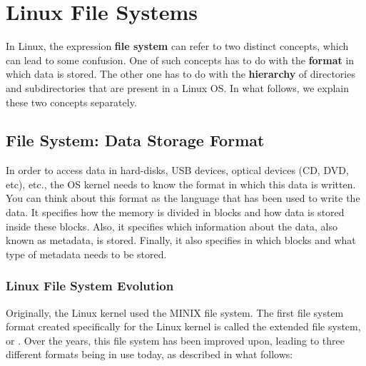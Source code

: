 \chapter{Linux File Systems}\label{ch:file_system}

In Linux, the expression \textbf{file system} can refer to two distinct concepts, which can lead to some confusion. One of such concepts has to do with the \textbf{format} in which data is stored. The other one has to do with the \textbf{hierarchy} of directories and subdirectories that are present in a Linux \acs{OS}. In what follows, we explain these two concepts separately.

\section{File System: Data Storage Format}
\label{sec:data_storage_format}

In order to access data in hard-disks, USB devices, optical devices (CD, DVD, etc), etc., the \acs{OS} kernel needs to know the format in which this data is written. You can think about this format as the language that has been used to write the data. It specifies how the memory is divided in blocks and how data is stored inside these blocks. Also, it specifies which information about the data, also known as metadata, is stored. Finally, it also specifies in which blocks and what type of metadata needs to be stored.

\subsection{Linux File System Evolution}

Originally, the Linux kernel used the MINIX file system. The first file system format created specifically for the Linux kernel is called the extended file system, or . Over the years, this file system has been improved upon, leading to three different formats being in use today, as described in what follows:


